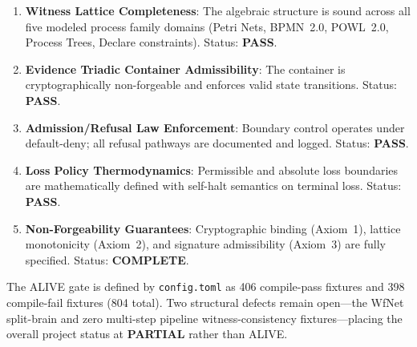 \begin{enumerate}
  \item \textbf{Witness Lattice Completeness}: The algebraic structure is sound across
    all five modeled process family domains (Petri Nets, BPMN~2.0, POWL~2.0, Process
    Trees, Declare constraints). Status: \textbf{PASS}.
  \item \textbf{Evidence Triadic Container Admissibility}: The container is cryptographically
    non-forgeable and enforces valid state transitions. Status: \textbf{PASS}.
  \item \textbf{Admission/Refusal Law Enforcement}: Boundary control operates under
    default-deny; all refusal pathways are documented and logged. Status: \textbf{PASS}.
  \item \textbf{Loss Policy Thermodynamics}: Permissible and absolute loss boundaries
    are mathematically defined with self-halt semantics on terminal loss. Status: \textbf{PASS}.
  \item \textbf{Non-Forgeability Guarantees}: Cryptographic binding (Axiom~1), lattice
    monotonicity (Axiom~2), and signature admissibility (Axiom~3) are fully specified.
    Status: \textbf{COMPLETE}.
\end{enumerate}

The ALIVE gate is defined by \texttt{config.toml} as 406 compile-pass fixtures and
398 compile-fail fixtures (804 total). Two structural defects remain open---the WfNet
split-brain and zero multi-step pipeline witness-consistency fixtures---placing the
overall project status at \textbf{PARTIAL} rather than ALIVE.
